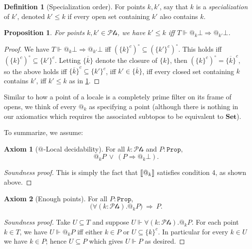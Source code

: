 \documentclass[11pt, oneside, article]{memoir}
\makeatletter
\theoremstyle{plain}
\newtheorem{proposition}[theorem]{Proposition}
\theoremstyle{definition}
\newtheorem{definition}[theorem]{Definition}
\newtheorem{axiom}{Axiom}\Crefname{axiom}{Axiom}{Axioms}
\theoremstyle{remark}
\newenvironment{soundproof}{\begin{proof}[Soundness proof]}{\end{proof}}
\renewcommand{\ss}{\subseteq}
\DeclarePairedDelimiter{\church}{\llbracket}{\rrbracket}
\newcommand{\const}[1]{\mathtt{#1}}
\newcommand{\Cat}[1]{\mathbf{#1}}
\newcommand{\ol}[1]{\overline{#1}}
\newcommand{\forces}{\Vdash}
\newcommand{\prop}{\const{Prop}}
\newcommand{\pt}{k}				%
\newcommand{\Pts}{\mathcal{Pts}}		%
\newcommand{\AtSymbol}{{@}}
\newcommand{\At}[1][\pt]{\AtSymbol_{#1}}
\newcommand{\imp}{\Rightarrow}
\newcommand{\false}{\bot}
\makeatother
\begin{document}
\begin{definition}[Specialization order]\label{def.specialization}
For points $\pt,\pt'$, say that $\pt$ is a \emph{specialization} of $\pt'$, denoted $\pt'\leq\pt$ if every open set containing $\pt'$ also contains $\pt$.
\end{definition}

\begin{proposition}\label{prop.specialization}
For points $\pt,\pt'\in\Pts$, we have $\pt'\leq\pt$ iff $T\forces\At\false\imp\At[\pt']\false$.
\end{proposition}
\begin{proof}
We have $T\forces\At\false\imp\At[\pt']\false$ iff $(\{\pt\}^c)^\circ\ss(\{\pt'\}^c)^\circ$. This holds iff $(\{\pt\}^c)^\circ\ss\{\pt'\}^c$. Letting $\ol{\{\pt\}}$ denote the closure of $\{\pt\}$, then $(\{\pt\}^c)^\circ=\ol{\{\pt\}}^c$, so the above holds iff $\ol{\{\pt\}}^c\ss\{\pt'\}^c$, iff $\pt'\in\ol{\{\pt\}}$, iff every closed set containing $\pt$ contains $\pt'$, iff $\pt'\leq\pt$ as in \cref{def.specialization}.
\end{proof}


\medskip

Similar to how a point of a locale is a completely prime filter on its frame of opens, we think of every $\At $ as specifying a point (although there is nothing in our axiomatics which requires the associated subtopos to be equivalent to $\Cat{Set}$). 

To summarize, we assume:

\begin{axiom}[{$\At[]$-Local decidability}]\label{ax.local_dec}
	For all $\pt : \Pts$ and $P : \prop$,
	\[
		\At P \: \lor \: (P \imp \At \bot).
	\]
\end{axiom}

\begin{soundproof}
This is simply the fact that $\church{\At}$ satisfies condition 4, as shown above.
\end{soundproof}

\begin{axiom}[Enough points]\label{ax.enough_pts}
	For all $P : \prop$,
	\[
		\big( \forall (\pt : \Pts). \At P \big) \: \Rightarrow \: P.
	\]
\end{axiom}

\begin{soundproof}
Take $U\ss T$ and suppose $U\forces\forall (\pt : \Pts). \At P$. For each point $\pt\in T$, we have $U\forces\At P$ iff either $\pt\in P$ or $U\ss\{\pt\}^c$. In particular for every $\pt\in U$ we have $\pt\in P$; hence $U\ss P$ which gives $U\forces P$ as desired.
\end{soundproof}
\end{document}
